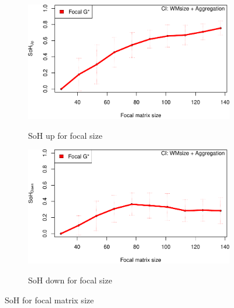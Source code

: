 \documentclass{itatnew}
\begin{document}
\begin{figure}[htp]
  \begin{subfigure}{\linewidth}
    \caption{SoH up for focal size}
    \includegraphics[width=\linewidth]{images/gen-focal-1}
    \label{fig:fUp}
  \end{subfigure}
  \hspace{1em}
  \begin{subfigure}{\linewidth}
    \caption{SoH down for focal size}
    \includegraphics[width=\linewidth]{images/gen-focal-2}
    \label{fig:fDown}
  \end{subfigure}
  \caption{SoH for focal matrix size}
  \label{fig:SoHFocal}
\end{figure}

%
%
\end{document}
